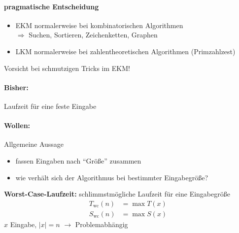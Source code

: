 \paragraph*{pragmatische Entscheidung}
\begin{itemize}
\item   EKM normalerweise bei kombinatorischen Algorithmen\\
        $\Rightarrow$ Suchen, Sortieren, Zeichenketten, Graphen
\item   LKM normalerweise bei zahlentheoretischen Algorithmen (Primzahlzest)
\end{itemize}
Vorsicht bei schmutzigen Tricks im EKM!

\paragraph*{Bisher:} Laufzeit für eine feste Eingabe
\paragraph*{Wollen:} Allgemeine Aussage
\begin{itemize}\renewcommand{\labelitemi}{$\hookrightarrow$}
\item   fassen Eingaben nach "`Größe"' zusammen
\item   wie verhält sich der Algorithmus bei bestimmter Eingabegröße?
\end{itemize}
\textbf{Worst-Case-Laufzeit:} schlimmstmögliche Laufzeit für eine Eingabegröße
\begin{align*}
T_{\text{wc}}(n) &= \max T(x) \\
S_{\text{wc}}(n) &= \max S(x)
\end{align*}
$x$ Eingabe, $|x| = n$ $\rightarrow$ Problemabhängig



